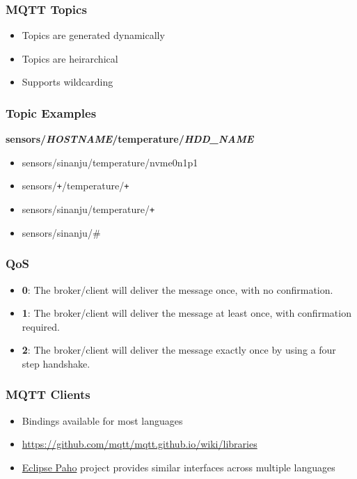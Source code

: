 \documentclass[aspectratio=169,11pt,hyperref={colorlinks=true}]{beamer}
\begin{document}
\begin{frame}
    \frametitle{MQTT Topics}
    \begin{itemize}
        \item Topics are generated dynamically
        \item Topics are heirarchical
        \item Supports wildcarding
    \end{itemize}
\end{frame}

\begin{frame}
    \frametitle{Topic Examples}
    \textbf{sensors/\textit{HOSTNAME}/temperature/\textit{HDD\_NAME}}
    \begin{itemize}
        \item sensors/sinanju/temperature/nvme0n1p1
        \item sensors/\texttt{+}/temperature/\texttt{+}
        \item sensors/sinanju/temperature/\texttt{+}
        \item sensors/sinanju/\#
    \end{itemize}
\end{frame}

\begin{frame}
    \frametitle{QoS}
    \begin{itemize}
        \item \textbf{0}: The broker/client will deliver the message once, with no confirmation.
        \item \textbf{1}: The broker/client will deliver the message at least once, with confirmation required.
        \item \textbf{2}: The broker/client will deliver the message exactly once by using a four step handshake.
    \end{itemize}
\end{frame}

\begin{frame}
    \frametitle{MQTT Clients}
    \begin{itemize}
        \item Bindings available for most languages
        \item \href{https://github.com/mqtt/mqtt.github.io/wiki/libraries}{https://github.com/mqtt/mqtt.github.io/wiki/libraries}
        \item \href{https://www.eclipse.org/paho/}{Eclipse Paho} project provides similar interfaces across multiple languages
    \end{itemize}
\end{frame}
\end{document}
